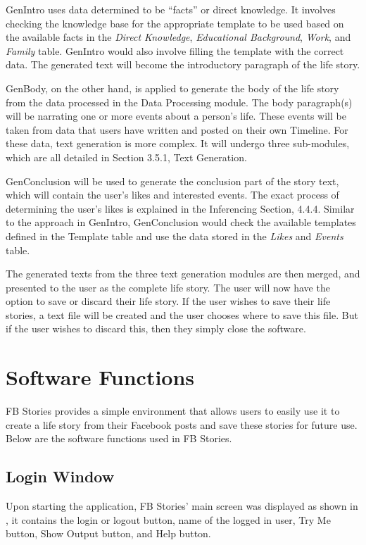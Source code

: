 GenIntro uses data determined to be ``facts'' or direct knowledge. It involves checking the knowledge base for the appropriate template to be used based on the available facts in the \textit{Direct Knowledge}, \textit{Educational Background}, \textit{Work}, and \textit{Family} table. GenIntro would also involve filling the template with the correct data. The generated text will become the introductory paragraph of the life story.

GenBody, on the other hand, is applied to generate the body of the life story from the data processed in the Data Processing module. The body paragraph(s) will be narrating one or more events about a person's life. These events will be taken from data that users have written and posted on their own Timeline. For these data, text generation is more complex. It will undergo three sub-modules, which are all detailed in Section 3.5.1, Text Generation.

GenConclusion will be used to generate the conclusion part of the story text, which will contain the user's likes and interested events. The exact process of determining the user's likes is explained in the Inferencing Section, 4.4.4. Similar to the approach in GenIntro, GenConclusion would check the available templates defined in the Template table and use the data stored in the \textit{Likes} and \textit{Events} table.

The generated texts from the three text generation modules are then merged, and presented to the user as the complete life story. The user will now have the option to save or discard their life story. If the user wishes to save their life stories, a text file will be created and the user chooses where to save this file. But if the user wishes to discard this, then they simply close the software.

\section{Software Functions}
FB Stories provides a simple environment that allows users to easily use it to create a life story from their Facebook posts and save these stories for future use. Below are the software functions used in FB Stories.

\subsection{Login Window}
Upon starting the application, FB Stories' main screen was displayed as shown in , it contains the login or logout button, name of the logged in user, Try Me button, Show Output button, and Help button.

